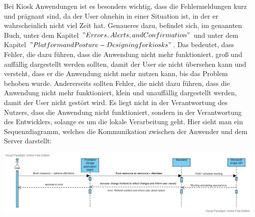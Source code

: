 Bei Kiosk Anwendungen ist es besonders wichtig, dass die Fehlermeldungen kurz und prägnant sind, da der User ohnehin in einer Situation ist, in der er wahrscheinlich nicht viel Zeit hat.
Genaueres dazu, befindet sich, im genannten Buch, unter dem Kapitel \("Errors, Alerts, and Confirmation"\) und unter dem Kapitel \("Platform and Posture - Designing for kiosks"\).
Das bedeutet, dass Fehler, die dazu führen, dass die Anwendung nicht mehr funktioniert, groß und auffällig dargestellt werden sollten, damit der User sie nicht übersehen kann und versteht, dass er die Anwendung nicht mehr nutzen kann, bis das Problem behoben wurde.
Andererseits sollten Fehler, die nicht dazu führen, dass die Anwendung nicht mehr funktioniert, klein und unauffällig dargestellt werden, damit der User nicht gestört wird.
Es liegt nicht in der Verantwortung des Nutzers, dass die Anwendung nicht funktioniert, sondern in der Verantwortung des Entwicklers, solange es um die lokale Verarbeitung geht.
\newline
\newline
Hier sieht man ein Sequenzdiagramm, welches die Kommunikation zwischen der Anwender und dem Server darstellt:
\newline
\newline
\par\vspace{0.5cm}
\centering
\includegraphics[width=\textwidth]{Bilder/Objektorientiertes Design/Sequence diagram for ressource booking (3)}
\par\vspace{0.5cm}
\raggedright
\newline
\newline

